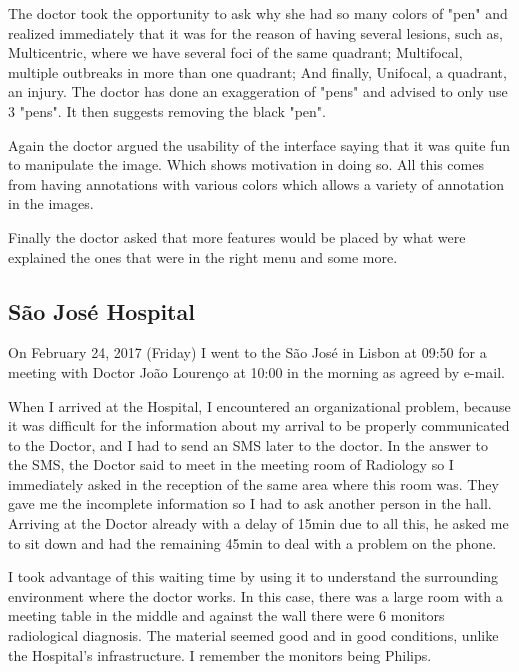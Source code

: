 \clearpage

The doctor took the opportunity to ask why she had so many colors of "pen" and realized immediately that it was for the reason of having several lesions, such as, Multicentric, where we have several foci of the same quadrant; Multifocal, multiple outbreaks in more than one quadrant; And finally, Unifocal, a quadrant, an injury. The doctor has done an exaggeration of "pens" and advised to only use 3 "pens". It then suggests removing the black "pen".

Again the doctor argued the usability of the interface saying that it was quite fun to manipulate the image. Which shows motivation in doing so.
All this comes from having annotations with various colors which allows a variety of annotation in the images.

Finally the doctor asked that more features would be placed by what were explained the ones that were in the right menu and some more.

\subsection{S\~{a}o Jos\'{e} Hospital}

On February 24, 2017 (Friday) I went to the S\~{a}o Jos\'{e} in Lisbon at 09:50 for a meeting with Doctor Jo\~{a}o Louren\c{c}o at 10:00 in the morning as agreed by e-mail.

When I arrived at the Hospital, I encountered an organizational problem, because it was difficult for the information about my arrival to be properly communicated to the Doctor, and I had to send an SMS later to the doctor. In the answer to the SMS, the Doctor said to meet in the meeting room of Radiology so I immediately asked in the reception of the same area where this room was. They gave me the incomplete information so I had to ask another person in the hall. Arriving at the Doctor already with a delay of 15min due to all this, he asked me to sit down and had the remaining 45min to deal with a problem on the phone.

I took advantage of this waiting time by using it to understand the surrounding environment where the doctor works. In this case, there was a large room with a meeting table in the middle and against the wall there were 6 monitors radiological diagnosis. The material seemed good and in good conditions, unlike the Hospital's infrastructure. I remember the monitors being Philips.

\clearpage

